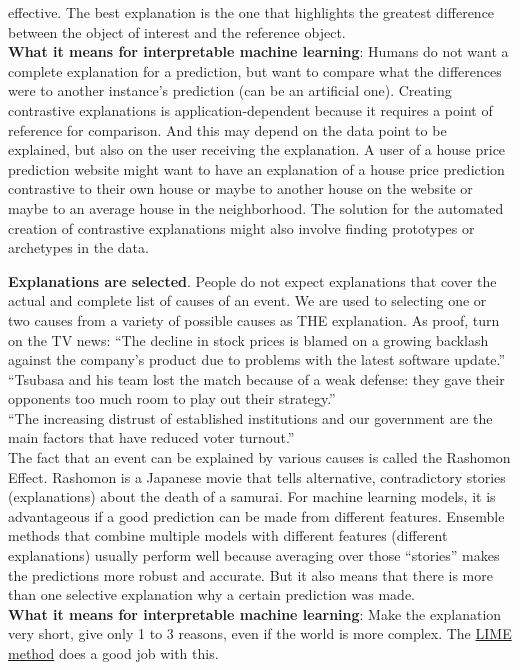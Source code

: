 \documentclass[12pt,]{krantz}
\begin{document}
effective. The best explanation is the one that highlights the greatest
difference between the object of interest and the reference object.\\
\textbf{What it means for interpretable machine learning}: Humans do not
want a complete explanation for a prediction, but want to compare what
the differences were to another instance's prediction (can be an
artificial one). Creating contrastive explanations is
application-dependent because it requires a point of reference for
comparison. And this may depend on the data point to be explained, but
also on the user receiving the explanation. A user of a house price
prediction website might want to have an explanation of a house price
prediction contrastive to their own house or maybe to another house on
the website or maybe to an average house in the neighborhood. The
solution for the automated creation of contrastive explanations might
also involve finding prototypes or archetypes in the data.

\textbf{Explanations are selected}. People do not expect explanations
that cover the actual and complete list of causes of an event. We are
used to selecting one or two causes from a variety of possible causes as
THE explanation. As proof, turn on the TV news: ``The decline in stock
prices is blamed on a growing backlash against the company's product due
to problems with the latest software update.''\\
``Tsubasa and his team lost the match because of a weak defense: they
gave their opponents too much room to play out their strategy.''\\
``The increasing distrust of established institutions and our government
are the main factors that have reduced voter turnout.''\\
The fact that an event can be explained by various causes is called the
Rashomon Effect. Rashomon is a Japanese movie that tells alternative,
contradictory stories (explanations) about the death of a samurai. For
machine learning models, it is advantageous if a good prediction can be
made from different features. Ensemble methods that combine multiple
models with different features (different explanations) usually perform
well because averaging over those ``stories'' makes the predictions more
robust and accurate. But it also means that there is more than one
selective explanation why a certain prediction was made.\\
\textbf{What it means for interpretable machine learning}: Make the
explanation very short, give only 1 to 3 reasons, even if the world is
more complex. The \protect\hyperlink{lime}{LIME method} does a good job
with this.
\end{document}
